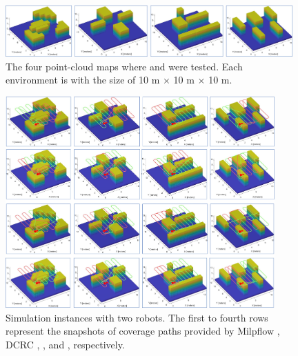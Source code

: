 \documentclass[journal,article,submit,pdftex,moreauthors]{Definitions/mdpi}
\begin{document}
\begin{figure}[htbp] %
	\centering  %
    \vspace{0 cm} %
    \includegraphics[width=0.98\textwidth]{8.jpg}
    \caption{ The four point-cloud maps where  and  were tested. Each environment is with the size of 10 m $\times$ 10 m $\times$ 10 m. }
   \label{Fig_8}
\end{figure}



\begin{figure}[htbp] %
	\centering  %
    \vspace{0 cm} %
    \includegraphics[width=0.92\textwidth]{8a.jpg}
    \caption{ Simulation instances with two robots. The first to fourth rows represent the snapshots of coverage paths provided by Milpflow \cite{c39}, DCRC \cite{karapetyan2018multi}, , and , respectively. }
    \vspace{-0.2 cm} %
   \label{Fig_8a}
\end{figure}
\end{document}
